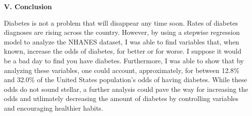 \documentclass[letter,12pt]{article}
\begin{document}
	\begin{center}
		\textbf{V. Conclusion}\par
	\end{center}
	\justify
  Diabetes is not a problem that will disappear any time soon. Rates of diabetes diagnoses are rising across the country. However, by using a stepwise regression model to analyze the NHANES dataset, I was able to find variables that, when known, increase the odds of diabetes, for better or for worse. I suppose it would be a bad day to find you have diabetes. Furthermore, I was able to show that by analyzing these variables, one could account, approximately, for between 12.8\% and 32.0\% of the United States population's odds of having diabetes. While these odds do not sound stellar, a further analysis could pave the way for increasing the odds and utlimately decreasing the amount of diabetes by controlling variables and encouraging healthier habits.
	
	\newpage
	
\end{document}
